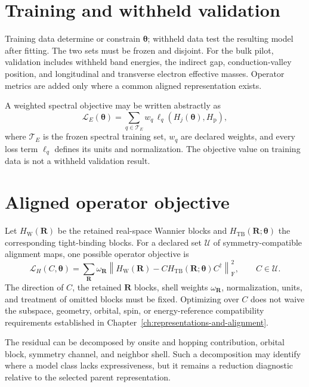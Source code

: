 \section{Training and withheld validation}

Training data determine or constrain $\boldsymbol\theta$; withheld data test the
resulting model after fitting. The two sets must be frozen and disjoint. For the
bulk pilot, validation includes withheld band energies, the indirect gap,
conduction-valley position, and longitudinal and transverse electron effective
masses. Operator metrics are added only where a common aligned representation
exists.

A weighted spectral objective may be written abstractly as
\begin{equation}
  \mathcal L_E(\boldsymbol\theta)
  =
  \sum_{q\in\mathcal T_E}
  w_q\,
  \ell_q\!\left(
    H_j(\boldsymbol\theta),H_{\mathrm p}
  \right),
\end{equation}
where $\mathcal T_E$ is the frozen spectral training set, $w_q$ are declared
weights, and every loss term $\ell_q$ defines its units and normalization. The
objective value on training data is not a withheld validation result.

\section{Aligned operator objective}

Let $H_{\mathrm W}(\mathbf R)$ be the retained real-space Wannier blocks and
$H_{\mathrm{TB}}(\mathbf R;\boldsymbol\theta)$ the corresponding tight-binding
blocks. For a declared set $\mathcal U$ of symmetry-compatible alignment maps,
one possible operator objective is
\begin{equation}
  \mathcal L_H(C,\boldsymbol\theta)
  =
  \sum_{\mathbf R}\omega_{\mathbf R}
  \left\|
    H_{\mathrm W}(\mathbf R)
    -C H_{\mathrm{TB}}(\mathbf R;\boldsymbol\theta)C^{\dagger}
  \right\|_{\mathrm F}^{2},
  \qquad C\in\mathcal U.
\end{equation}
The direction of $C$, the retained $\mathbf R$ blocks, shell weights
$\omega_{\mathbf R}$, normalization, units, and treatment of omitted blocks
must be fixed. Optimizing over $C$ does not waive the subspace, geometry,
orbital, spin, or energy-reference compatibility requirements established in
Chapter~\ref{ch:representations-and-alignment}.

The residual can be decomposed by onsite and hopping contribution, orbital
block, symmetry channel, and neighbor shell. Such a decomposition may identify
where a model class lacks expressiveness, but it remains a reduction diagnostic
relative to the selected parent representation.

